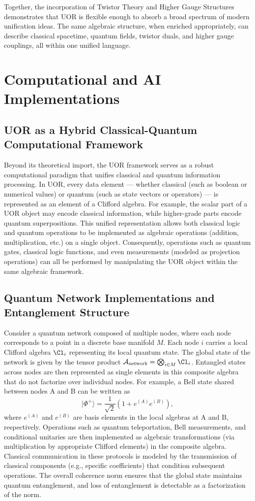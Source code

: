 \documentclass[12pt]{article}
\begin{document}
Together, the incorporation of Twistor Theory and Higher Gauge Structures demonstrates that UOR is flexible enough to absorb a broad spectrum of modern unification ideas. The same algebraic structure, when enriched appropriately, can describe classical spacetime, quantum fields, twistor duals, and higher gauge couplings, all within one unified language.

\section{Computational and AI Implementations}

\subsection{UOR as a Hybrid Classical-Quantum Computational Framework}
Beyond its theoretical import, the UOR framework serves as a robust computational paradigm that unifies classical and quantum information processing. In UOR, every data element --- whether classical (such as boolean or numerical values) or quantum (such as state vectors or operators) --- is represented as an element of a Clifford algebra. For example, the scalar part of a UOR object may encode classical information, while higher-grade parts encode quantum superpositions. This unified representation allows both classical logic and quantum operations to be implemented as algebraic operations (addition, multiplication, etc.) on a single object. Consequently, operations such as quantum gates, classical logic functions, and even measurements (modeled as projection operations) can all be performed by manipulating the UOR object within the same algebraic framework.

\subsection{Quantum Network Implementations and Entanglement Structure}
Consider a quantum network composed of multiple nodes, where each node corresponds to a point in a discrete base manifold $M$. Each node $i$ carries a local Clifford algebra $\Cl_i$ representing its local quantum state. The global state of the network is given by the tensor product $\mathcal{A}_{\text{network}} = \bigotimes_{i \in M} \Cl_i$. Entangled states across nodes are then represented as single elements in this composite algebra that do not factorize over individual nodes. For example, a Bell state shared between nodes A and B can be written as 
\[
|\Phi^+\rangle = \frac{1}{\sqrt{2}}(1 + e^{(A)}e^{(B)}),
\]
where $e^{(A)}$ and $e^{(B)}$ are basis elements in the local algebras at A and B, respectively. Operations such as quantum teleportation, Bell measurements, and conditional unitaries are then implemented as algebraic transformations (via multiplication by appropriate Clifford elements) in the composite algebra. Classical communication in these protocols is modeled by the transmission of classical components (e.g., specific coefficients) that condition subsequent operations. The overall coherence norm ensures that the global state maintains quantum entanglement, and loss of entanglement is detectable as a factorization of the norm.
\end{document}
